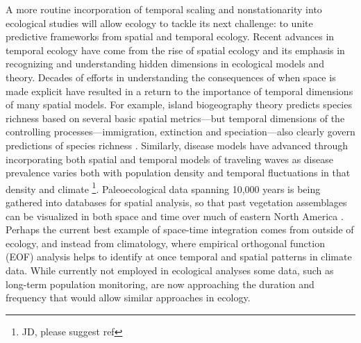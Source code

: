 \documentclass[11pt,a4paper,oneside]{article}
\begin{document}
A more routine incorporation of temporal scaling and nonstationarity into ecological studies will allow ecology to tackle its next challenge: to unite predictive frameworks from spatial and temporal ecology. Recent advances in temporal ecology have come from the rise of spatial ecology and its emphasis in recognizing and understanding hidden dimensions in ecological models and theory. Decades of efforts in understanding the consequences of when space is made explicit have resulted in a return to the importance of temporal dimensions of many spatial models. For example, island biogeography theory predicts species richness based on several basic spatial metrics---but temporal dimensions of the controlling processes---immigration, extinction and speciation---also clearly govern predictions of species richness \citep{Wiens2011}. Similarly, disease models have advanced through incorporating both spatial and temporal models of traveling waves \citep{Grenfell:2001ox} as disease prevalence varies both with population density and temporal fluctuations in that density \citep{Grenfell:2001ox} and climate \footnote{JD, please suggest ref}. Paleoecological data spanning 10,000 years is being gathered into databases for spatial analysis, so that past vegetation assemblages can be visualized in both space and time over much of eastern North America \citep{Brewer2012}. Perhaps the current best example of space-time integration comes from outside of ecology, and instead from climatology, where empirical orthogonal function (EOF) analysis helps to identify at once temporal and spatial patterns in climate data. While currently not employed in ecological analyses some data, such as long-term population monitoring, are now approaching the duration and frequency that would allow similar approaches in ecology. \\
\end{document}
